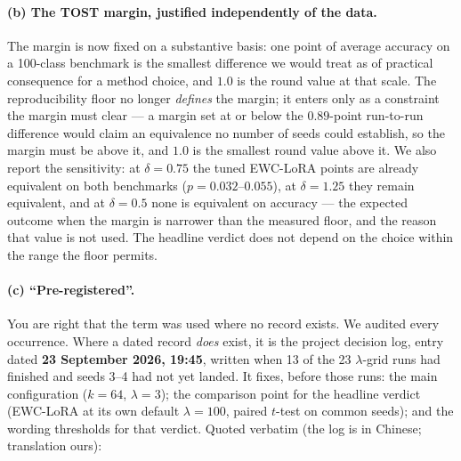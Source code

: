 \paragraph{(b) The TOST margin, justified independently of the data.} The margin is now fixed
on a substantive basis: one point of average accuracy on a 100-class benchmark is the smallest
difference we would treat as of practical consequence for a method choice, and $1.0$ is the
round value at that scale. The reproducibility floor no longer \emph{defines} the margin; it
enters only as a constraint the margin must clear --- a margin set at or below the $0.89$-point
run-to-run difference would claim an equivalence no number of seeds could establish, so the
margin must be above it, and $1.0$ is the smallest round value above it. We also report the
sensitivity: at $\delta{=}0.75$ the tuned EWC-LoRA points are already equivalent on both
benchmarks ($p=0.032$--$0.055$), at $\delta{=}1.25$ they remain equivalent, and at
$\delta{=}0.5$ none is equivalent on accuracy --- the expected outcome when the margin is
narrower than the measured floor, and the reason that value is not used. The headline verdict does not depend on the
choice within the range the floor permits.

\paragraph{(c) ``Pre-registered''.} You are right that the term was used where no record
exists. We audited every occurrence. Where a dated record \emph{does} exist, it is the
project decision log, entry dated \textbf{23 September 2026, 19:45}, written when 13 of the 23
$\lambda$-grid runs had finished and seeds 3--4 had not yet landed. It fixes, before those
runs: the main configuration ($k{=}64$, $\lambda{=}3$); the comparison point for the headline
verdict (EWC-LoRA at its own default $\lambda{=}100$, paired $t$-test on common seeds); and
the wording thresholds for that verdict. Quoted verbatim (the log is in Chinese; translation
ours):

